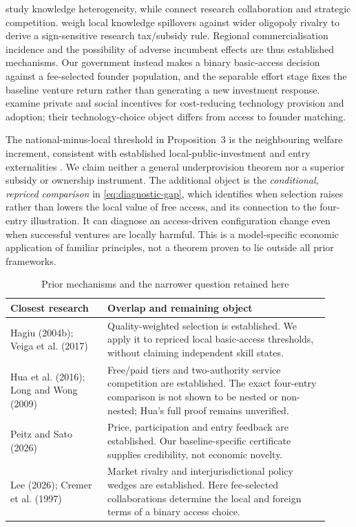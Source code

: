 \documentclass[11pt]{article}
\begin{document}
\citet{BerliantFujita2008,BerliantFujita2011} study knowledge heterogeneity, while \citet{DAspremontJacquemin1988,GoyalJoshi2003} connect research collaboration and strategic competition.
\citet{Lee2026} weigh local knowledge spillovers against wider oligopoly rivalry to derive a sign-sensitive research tax/subsidy rule.
Regional commercialisation incidence and the possibility of adverse incumbent effects are thus established mechanisms.
Our government instead makes a binary basic-access decision against a fee-selected founder population, and the separable effort stage fixes the baseline venture return rather than generating a new investment response.
\citet{HacknerHerzing2026} examine private and social incentives for cost-reducing technology provision and adoption; their technology-choice object differs from access to founder matching.

The national-minus-local threshold in Proposition~3 is the neighbouring welfare increment, consistent with established local-public-investment and entry externalities \citep{CremerMarchandPestieau1997,MankiwWhinston1986}.
We claim neither a general underprovision theorem nor a superior subsidy or ownership instrument.
The additional object is the \emph{conditional, repriced comparison} in \eqref{eq:diagnostic-gap}, which identifies when selection raises rather than lowers the local value of free access, and its connection to the four-entry illustration.
It can diagnose an access-driven configuration change even when successful ventures are locally harmful.
This is a model-specific economic application of familiar principles, not a theorem proven to lie outside all prior frameworks.

\begin{table}[htbp]\centering\small
\caption{Prior mechanisms and the narrower question retained here}\label{tab:prior}
\begin{tabular}{@{}>{\raggedright\arraybackslash}p{0.28\linewidth}>{\raggedright\arraybackslash}p{0.64\linewidth}@{}}\toprule
Closest research & Overlap and remaining object\\\midrule
Hagiu (2004b); Veiga et al. (2017) &
Quality-weighted selection is established. We apply it to repriced local basic-access thresholds, without claiming independent skill states.\\\addlinespace[4pt]
Hua et al. (2016); Long and Wong (2009) &
Free/paid tiers and two-authority service competition are established. The exact four-entry comparison is not shown to be nested or non-nested; Hua's full proof remains unverified.\\\addlinespace[4pt]
Peitz and Sato (2026) &
Price, participation and entry feedback are established. Our baseline-specific certificate supplies credibility, not economic novelty.\\\addlinespace[4pt]
Lee (2026); Cremer et al. (1997) &
Market rivalry and interjurisdictional policy wedges are established. Here fee-selected collaborations determine the local and foreign terms of a binary access choice.\\\bottomrule
\end{tabular}
\end{table}
\end{document}
